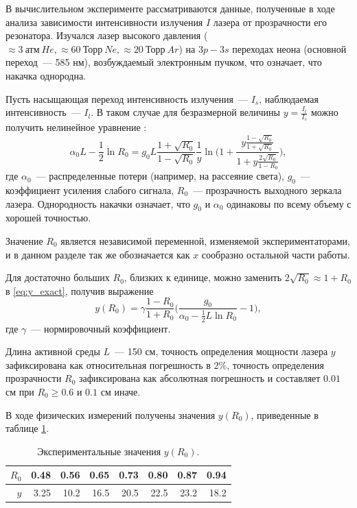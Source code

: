 \documentclass[tikz,11pt,a4paper]{article}
\begin{document}
В вычислительном эксперименте рассматриваются данные, полученные в ходе анализа
зависимости интенсивности излучения $I$ лазера от прозрачности его резонатора.
Изучался лазер высокого давления ($\approx 3\ \text{атм}\ He, \approx 60\ \text{Торр}\ Ne, \approx 20\ \text{Торр}\ Ar$) на
$3p-3s$ переходах неона (основной переход~--- 585 нм), возбуждаемый электронным пучком,
что означает, что накачка однородна.

Пусть насыщающая переход интенсивность излучения~--- $I_s$, наблюдаемая интенсивность~---
$I_l$. В таком случае для безразмерной величины $y = \frac{I_l}{I_s}$ можно получить 
нелинейное уравнение \cite{...}:
\begin{equation}
  \alpha_0 L - \frac{1}{2} \ln R_0 = g_0 L \frac{1 + \sqrt{R_0}}{1 - \sqrt{R_0}} \frac{1}{y} \ln \Big( 1 + \frac{y \frac{1 - \sqrt{R_0}}{1 + \sqrt{R_0}}}{1 + y \frac{2 \sqrt{R_0}}{1 - R_0}} \Big),
  \label{eq:y_exact}
\end{equation}
где $\alpha_0$~--- распределенные потери (например, на рассеяние света),
$g_0$~--- коэффициент усиления слабого сигнала, $R_0$~--- прозрачность выходного
зеркала лазера. Однородность накачки означает, что $g_0$ и $\alpha_0$ одинаковы по
всему объему с хорошей точностью.

Значение $R_0$ является независимой переменной, изменяемой экспериментаторами, и в данном
разделе так же обозначается как $x$ сообразно остальной части работы.

Для достаточно больших $R_0$, близких к единице, можно заменить
$2 \sqrt{R_0} \approx 1 + R_0$ в \eqref{eq:y_exact}, получив выражение
\begin{equation}
  y(R_0) = \gamma \frac{1 - R_0}{1 + R_0} \Big(\frac{g_0}{\alpha_0 - \frac{1}{2} L \ln R_0} - 1\Big),
\end{equation}
где $\gamma$~--- нормировочный коэффициент.

Длина активной среды $L$~--- 150 см, точность определения мощности лазера $y$ зафиксирована
как относительная погрешность в $2\%$, точность определения прозрачности $R_0$ зафиксирована как
абсолютная погрешность и составляет $0.01$ см при $R_0 \geq 0.6$ и $0.1$ см иначе.

В ходе физических измерений получены значения $y(R_0)$, приведенные в таблице \ref{tabl:measurements}.

\begin{table}[h]
  \caption{Экспериментальные значения $y(R_0)$.}
  \centering
  \begin{tabular}{| r | r | r | r | r | r | r | r |}
	\hline
	$R_0$	&	0.48	&	0.56	&	0.65	&	0.73	&	0.80	&	0.87	&	0.94	\\ \hline
	$y$		&	3.25	&	10.2	&	16.5	&	20.5	&	22.5	&	23.2	&	18.2	\\ \hline
  \end{tabular}
  \label{tabl:measurements}
\end{table}
\end{document}
